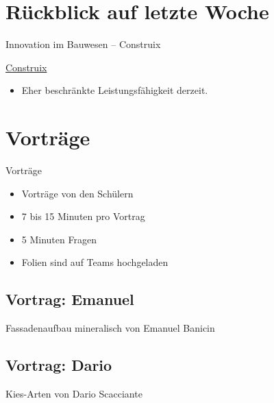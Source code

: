 \section{Rückblick auf letzte Woche}
\BlueSectionSlide


\begin{frame}{Innovation im Bauwesen -- Construix}

\href{https://www.baumeister.ch/construix-start/}{Construix}

\begin{itemize}
    \item[\textbullet] Eher beschränkte Leistungsfähigkeit derzeit.
\end{itemize}

\end{frame}



\section{Vorträge}
\BlueSectionSlide

\begin{frame}{Vorträge}
    \begin{itemize}
        \item[\textbullet] Vorträge von den Schülern
        \item[\textbullet] 7 bis 15 Minuten pro Vortrag
        \item[\textbullet] 5 Minuten Fragen
        \item[\textbullet] Folien sind auf Teams hochgeladen
    \end{itemize}
\end{frame}

\subsection{Vortrag: Emanuel}
\begin{frame}{Fassadenaufbau mineralisch}
    von Emanuel Banicin
\end{frame}

\subsection{Vortrag: Dario}
\begin{frame}{Kies-Arten}
    von Dario Scacciante
\end{frame}



